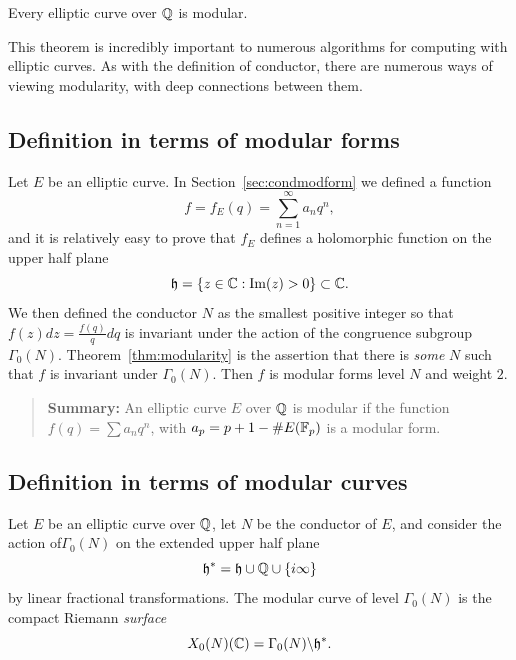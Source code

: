 \documentclass{book}
\begin{document}
\begin{theorem}\label{thm:modularity}
Every elliptic curve over $\mathbb{Q}$ is modular.
\end{theorem}
This theorem is incredibly
important to numerous algorithms for computing with elliptic curves.
As with the definition of conductor, there
are numerous ways of viewing modularity, with deep connections between them.

\subsection{Definition in terms of modular forms}

Let $E$ be an elliptic curve.
In Section~\ref{sec:condmodform} we defined a function
$$
f = f_E(q) = \sum_{n=1}^{\infty} a_n q^n,
$$
and it is relatively easy to prove that $f_E$ defines
a holomorphic function on the upper half plane
$$
  \mathfrak{h} = \{z \in \mathbb{C} : \operatorname{Im}(z) > 0\} \subset \mathbb{C}.
$$
We then defined the conductor $N$ as the smallest positive
integer so that $f(z)dz = \frac{f(q)}{q} dq$ is invariant
under the action of the congruence subgroup
$\Gamma_0(N)$.   Theorem~\ref{thm:modularity} is  the assertion
that there is {\em some} $N$ such that $f$ is invariant under $\Gamma_0(N)$.
Then $f$ is modular forms level $N$ and weight $2$.

\begin{quote}
{\bf Summary:} An elliptic curve $E$ over $\mathbb{Q}$ is modular if
the function $f(q) = \sum a_n q^n$, with $a_p = p+1-\#E(\mathbb{F}_p)$
is a modular form.
\end{quote}


\subsection{Definition in terms of modular curves}

Let $E$ be an elliptic curve over $\mathbb{Q}$, let $N$
be the conductor of $E$, and consider the action
of$\Gamma_0(N)$ on the extended upper half plane
$$
\mathfrak{h}^*=\mathfrak{h}\cup\mathbb{Q}\cup\{i\infty\}
$$
by linear fractional transformations.
The modular curve of level $\Gamma_0(N)$ is the compact Riemann {\em surface}
$$
  X_0(N)(\mathbb{C}) = \Gamma_0(N) \backslash \mathfrak{h}^*.
$$
\end{document}
